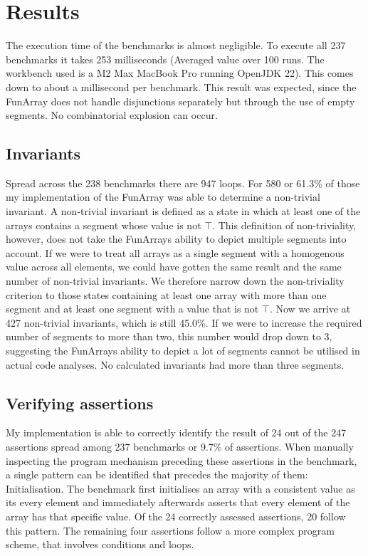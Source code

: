 \section{Results}

The execution time of the benchmarks is almost negligible. To execute all 237 benchmarks it takes 253 milliseconds (Averaged value over 100 runs. The workbench used is a M2 Max MacBook Pro running OpenJDK 22). This comes down to about a millisecond per benchmark. This result was expected, since the FunArray does not handle disjunctions separately but through the use of empty segments. No combinatorial explosion can occur.

\subsection{Invariants}
Spread across the 238 benchmarks there are 947 loops. For 580 or 61.3\% of those my implementation of the FunArray was able to determine a non-trivial invariant. A non-trivial invariant is defined as a state in which at least one of the arrays contains a segment whose value is not $\top$.
This definition of non-triviality, however, does not take the FunArrays ability to depict multiple segments into account. If we were to treat all arrays as a single segment with a homogenous value across all elements, we could have gotten the same result and the same number of non-trivial invariants. We therefore narrow down the non-triviality criterion to those states containing at least one array with more than one segment and at least one segment with a value that is not $\top$. Now we arrive at 427 non-trivial invariants, which is still 45.0\%. 
If we were to increase the required number of segments to more than two, this number would drop down to 3, suggesting the FunArrays ability to depict a lot of segments cannot be utilised in actual code analyses. No calculated invariants had more than three segments.

\subsection{Verifying assertions}

My implementation is able to correctly identify the result of 24 out of the 247 assertions spread among 237 benchmarks or 9.7\% of assertions. When manually inspecting the program mechanism preceding these assertions in the benchmark, a single pattern can be identified that precedes the majority of them: Initialisation. The benchmark first initialises an array with a consistent value as its every element and immediately afterwards asserts that every element of the array has that specific value. Of the 24 correctly assessed assertions, 20 follow this pattern. The remaining four assertions follow a more complex program scheme, that involves conditions and loops.



